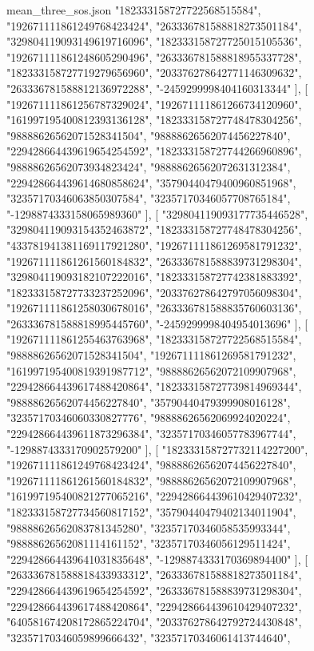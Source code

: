 \begin{filecontents*}[overwrite]{mean_three_sos.json}
    "182333158727722568515584",
    "192671111861249768423424",
    "263336781588818273501184",
    "329804119093149619716096",
    "182333158727725015105536",
    "192671111861248605290496",
    "263336781588818955337728",
    "182333158727719279656960",
    "203376278642771146309632",
    "263336781588812136972288",
    "-2459299998404160313344"
   ],
   [
    "192671111861256787329024",
    "192671111861266734120960",
    "161997195400812393136128",
    "182333158727748478304256",
    "98888626562071528341504",
    "98888626562074456227840",
    "229428664439619654254592",
    "182333158727744266960896",
    "98888626562073934823424",
    "98888626562072631312384",
    "229428664439614680858624",
    "35790440479400960851968",
    "32357170346063850307584",
    "32357170346057708765184",
    "-1298874333158065989360"
   ],
   [
    "329804119093177735446528",
    "329804119093154352463872",
    "182333158727748478304256",
    "433781941381169117921280",
    "192671111861269581791232",
    "192671111861261560184832",
    "263336781588839731298304",
    "329804119093182107222016",
    "182333158727742381883392",
    "182333158727733237252096",
    "203376278642797056098304",
    "192671111861258030678016",
    "263336781588835760603136",
    "263336781588818995445760",
    "-2459299998404954013696"
   ],
   [
    "192671111861255463763968",
    "182333158727722568515584",
    "98888626562071528341504",
    "192671111861269581791232",
    "161997195400819391987712",
    "98888626562072109907968",
    "229428664439617488420864",
    "182333158727739814969344",
    "98888626562074456227840",
    "35790440479399908016128",
    "32357170346060330827776",
    "98888626562069924020224",
    "229428664439611873296384",
    "32357170346057783967744",
    "-1298874333170902579200"
   ],
   [
    "182333158727732114227200",
    "192671111861249768423424",
    "98888626562074456227840",
    "192671111861261560184832",
    "98888626562072109907968",
    "161997195400821277065216",
    "229428664439610429407232",
    "182333158727734560817152",
    "35790440479402134011904",
    "98888626562083781345280",
    "32357170346058535993344",
    "98888626562081114161152",
    "32357170346056129511424",
    "229428664439641031835648",
    "-1298874333170369894400"
   ],
   [
    "263336781588818433933312",
    "263336781588818273501184",
    "229428664439619654254592",
    "263336781588839731298304",
    "229428664439617488420864",
    "229428664439610429407232",
    "640581674208172865224704",
    "203376278642792724430848",
    "32357170346059899666432",
    "32357170346061413744640",

\end{filecontents*}
